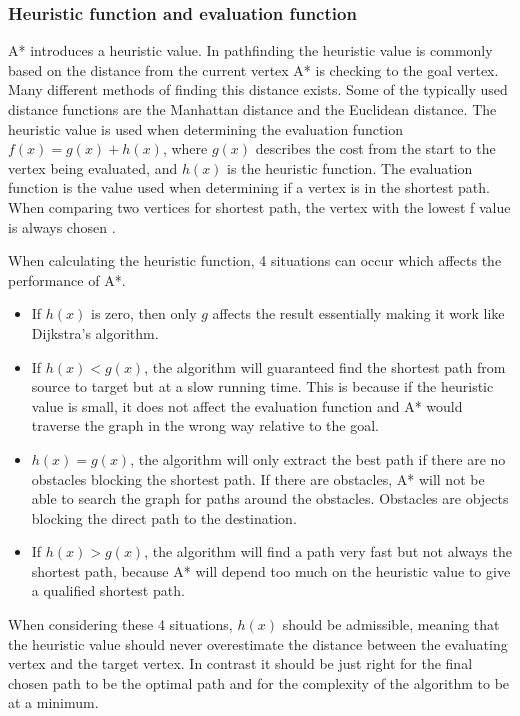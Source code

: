   \subsubsection{Heuristic function and evaluation function}
  A* introduces a heuristic value. In pathfinding the heuristic value is commonly based on the distance from the current vertex A* is checking to the goal vertex. Many different methods of finding this distance exists. Some of the typically used distance functions are the Manhattan distance and the Euclidean distance. The heuristic value is used when determining the evaluation function $f(x) = g(x) + h(x)$, where $g(x)$ describes the cost from the start to the vertex being evaluated, and $h(x)$ is the heuristic function. The evaluation function is the value used when determining if a vertex is in the shortest path. When comparing two vertices for shortest path, the vertex with the lowest f value is always chosen \cite{Patel2013}.

  When calculating the heuristic function, 4 situations can occur which affects the performance of A*.

    \begin{itemize}
    \item If $h(x)$ is zero, then only $g$ affects the result essentially making it work like Dijkstra's algorithm.

    \item If $h(x) < g(x)$, the algorithm will guaranteed find the shortest path from source to target but at a slow running time. This is because if the heuristic value is small, it does not affect the evaluation function and A* would traverse the graph in the wrong way relative to the goal.

    \item $h(x) = g(x)$, the algorithm will only extract the best path if there are no obstacles blocking the shortest path. If there are obstacles, A* will not be able to search the graph for paths around the obstacles. Obstacles are objects blocking the direct path to the destination.

    \item If $h(x) > g(x)$, the algorithm will find a path very fast but not always the shortest path, because A* will depend too much on the heuristic value to give a qualified shortest path.
  \end{itemize}

  When considering these 4 situations, $h(x)$ should be admissible, meaning that the heuristic value should never overestimate the distance between the evaluating vertex and the target vertex. In contrast it should be just right for the final chosen path to be the optimal path and for the complexity of the algorithm to be at a minimum. 

